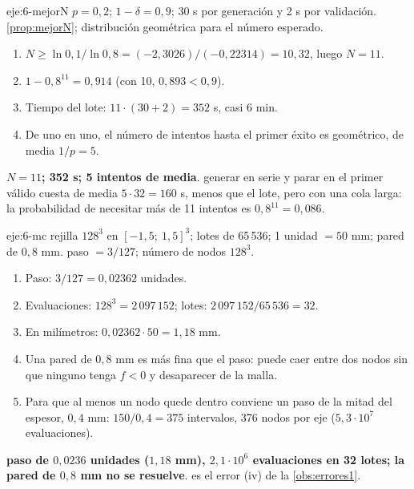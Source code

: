\begin{solucion}{eje:6-mejorN}
\datos $p=0{,}2$; $1-\delta=0{,}9$; 30 s por generación y 2 s por validación.
\planteamiento \cref{prop:mejorN}; distribución geométrica para el número esperado.
\pasos
\begin{enumerate}[label=\arabic*.]
  \item $N\ge\ln 0{,}1/\ln 0{,}8=(-2{,}3026)/(-0{,}22314)=10{,}32$, luego $N=11$.
  \item $1-0{,}8^{11}=0{,}914$ (con 10, $0{,}893<0{,}9$).
  \item Tiempo del lote: $11\cdot(30+2)=352$ s, casi 6 min.
  \item De uno en uno, el número de intentos hasta el primer éxito es geométrico, de media $1/p=5$.
\end{enumerate}
\resultado \textbf{$N=11$; 352 s; 5 intentos de media}.
\comprobacion generar en serie y parar en el primer válido cuesta de media $5\cdot 32=160$ s, menos que el lote, pero con una cola larga: la probabilidad de necesitar más de 11 intentos es $0{,}8^{11}=0{,}086$.
\end{solucion}

\begin{solucion}{eje:6-mc}
\datos rejilla $128^3$ en $[-1{,}5;\ 1{,}5]^3$; lotes de 65\,536; 1 unidad $=50$ mm; pared de $0{,}8$ mm.
\planteamiento paso $=3/127$; número de nodos $128^3$.
\pasos
\begin{enumerate}[label=\arabic*.]
  \item Paso: $3/127=0{,}02362$ unidades.
  \item Evaluaciones: $128^3=2\,097\,152$; lotes: $2\,097\,152/65\,536=32$.
  \item En milímetros: $0{,}02362\cdot 50=1{,}18$ mm.
  \item Una pared de $0{,}8$ mm es más fina que el paso: puede caer entre dos nodos sin que ninguno tenga $f<0$ y desaparecer de la malla.
  \item Para que al menos un nodo quede dentro conviene un paso de la mitad del espesor, $0{,}4$ mm: $150/0{,}4=375$ intervalos, 376 nodos por eje ($5{,}3\cdot 10^{7}$ evaluaciones).
\end{enumerate}
\resultado \textbf{paso de $0{,}0236$ unidades ($1{,}18$ mm), $2{,}1\cdot 10^{6}$ evaluaciones en 32 lotes; la pared de $0{,}8$ mm no se resuelve}.
\comprobacion es el error (iv) de la \cref{obs:errores1}.
\end{solucion}


